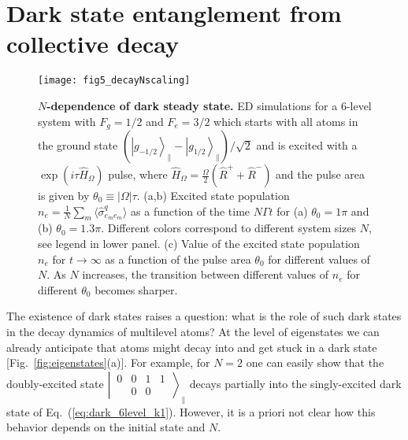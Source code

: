 \documentclass[aps,prx,superscriptaddress,twocolumn,notitlepage,nofootinbib,longbibliography]{revtex4-2}
\newcommand{\ket}[1]{\left|#1\right>}
\newcommand{\qusub}{q}
\begin{document}

\section{Dark state entanglement from collective decay\label{sec:entangl_decay}}

\begin{figure}[t]
\centering
\texttt{[image: fig5\_decayNscaling]}
\caption{\textbf{$N$-dependence of dark steady state.} ED simulations for a 6-level system with $F_g=1/2$ and $F_e=3/2$ which starts with all atoms in the ground state $( \ket{g_{-1/2}}_\parallel - \ket{g_{1/2}}_\parallel)/\sqrt{2}$ and is excited with a $\exp(i\tau \hat{H}_\Omega)$ pulse, where $\hat{H}_\Omega = \frac{\Omega}{2}(\hat{R}^+ + \hat{R}^-)$ and the pulse area is given by $\theta_0\equiv |\Omega| \tau$. (a,b) Excited state population $n_e = \frac{1}{N} \sum_m \langle \hat{\sigma}^{\qusub}_{e_me_m}\rangle$ as a function of the time $N\Gamma t$ for (a) $\theta_0=1\pi$ and (b) $\theta_0=1.3\pi$. Different colors correspond to different system sizes $N$, see legend in lower panel. (c) Value of the excited state population $n_e$ for $t\rightarrow\infty$ as a function of the pulse area $\theta_0$ for different values of $N$. As $N$ increases, the transition between different values of $n_e$ for different $\theta_0$ becomes sharper.}
\label{fig:decayNscaling}
\end{figure}


The existence of dark states raises a question: what is the role of such dark states in the decay dynamics of multilevel atoms? At the level of eigenstates we can already anticipate that atoms might decay into and get stuck in a dark state [Fig.~\ref{fig:eigenstates}(a)]. For example, for $N=2$ one can easily show that the doubly-excited state $\left|\, \begin{smallmatrix} 0 & 0 & 1 & 1 \\  & 0 & 0 &  \end{smallmatrix} \,\right\rangle_\parallel$ decays partially into the singly-excited dark state of Eq.~(\ref{eq:dark_6level_k1}). However, it is a priori not clear how this behavior depends on the initial state and $N$.
\end{document}
